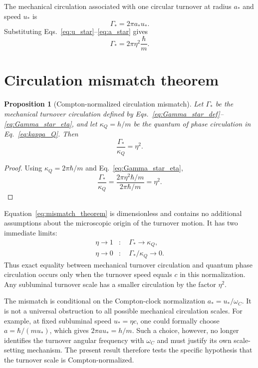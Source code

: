 \documentclass[11pt,a4paper]{article}
\newtheorem{proposition}{Proposition}
\newcommand{\kappaQ}{\kappa_{Q}}
\newcommand{\GammaStar}{\Gamma_{*}}
\newcommand{\omegaC}{\omega_{C}}
\newcommand{\uStar}{u_{*}}
\newcommand{\aStar}{a_{*}}
\begin{document}
The mechanical circulation associated with one circular turnover at radius $\aStar$ and speed $\uStar$ is
\begin{equation}
    \GammaStar=2\pi\aStar\uStar.
    \label{eq:Gamma_star_def}
\end{equation}
Substituting Eqs.~\eqref{eq:u_star}--\eqref{eq:a_star} gives
\begin{equation}
    \GammaStar
    =
    2\pi\eta^2\frac{\hbar}{m}.
    \label{eq:Gamma_star_eta}
\end{equation}

\section{Circulation mismatch theorem}

\begin{proposition}[Compton-normalized circulation mismatch]
Let $\GammaStar$ be the mechanical turnover circulation defined by Eqs.~\eqref{eq:Gamma_star_def}--\eqref{eq:Gamma_star_eta}, and let $\kappaQ=h/m$ be the quantum of phase circulation in Eq.~\eqref{eq:kappa_Q}. Then
\begin{equation}
    \boxed{
    \frac{\GammaStar}{\kappaQ}=\eta^2.
    }
    \label{eq:mismatch_theorem}
\end{equation}
\end{proposition}

\begin{proof}
Using $\kappaQ=2\pi\hbar/m$ and Eq.~\eqref{eq:Gamma_star_eta},
\begin{equation}
    \frac{\GammaStar}{\kappaQ}
    =
    \frac{2\pi\eta^2\hbar/m}{2\pi\hbar/m}
    =
    \eta^2.
\end{equation}
\end{proof}

Equation~\eqref{eq:mismatch_theorem} is dimensionless and contains no additional assumptions about the microscopic origin of the turnover motion. It has two immediate limits:
\begin{align}
    \eta\to 1 &: \quad \GammaStar\to\kappaQ,\\
    \eta\to 0 &: \quad \GammaStar/\kappaQ\to 0.
\end{align}
Thus exact equality between mechanical turnover circulation and quantum phase circulation occurs only when the turnover speed equals $c$ in this normalization. Any subluminal turnover scale has a smaller circulation by the factor $\eta^2$.

The mismatch is conditional on the Compton-clock normalization $\aStar=\uStar/\omegaC$. It is not a universal obstruction to all possible mechanical circulation scales. For example, at fixed subluminal speed $\uStar=\eta c$, one could formally choose $a=\hbar/(m\uStar)$, which gives $2\pi a\uStar=h/m$. Such a choice, however, no longer identifies the turnover angular frequency with $\omegaC$ and must justify its own scale-setting mechanism. The present result therefore tests the specific hypothesis that the turnover scale is Compton-normalized.
\end{document}
